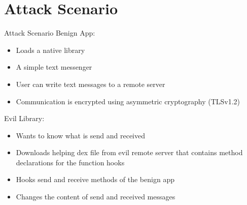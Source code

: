 \section{Attack Scenario}
\begin{frame}{Attack Scenario}
Benign App:
    \begin{itemize}
    \item Loads a native library
    \item A simple text messenger 
    \item User can write text messages to a remote server
    \item Communication is encrypted using asymmetric cryptography (TLSv1.2) 
    \end{itemize}
Evil Library:
    \begin{itemize}
    \item Wants to know what is send and received
    \item Downloads helping dex file from evil remote server that contains method declarations for the function hooks
    \item Hooks send and receive methods of the benign app
    \item Changes the content of send and received messages 
    \end{itemize}    
\end{frame}

